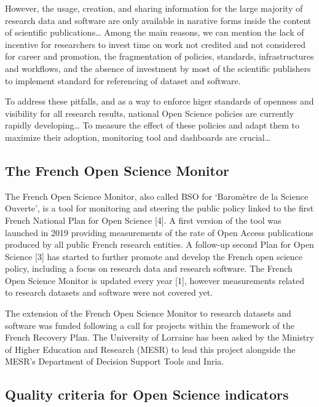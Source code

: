 \documentclass[
]{article}
\begin{document}
However, the usage, creation, and sharing information for the large
majority of research data and software are only available in narative
forms inside the content of scientific publications\ldots{} Among the
main reasons, we can mention the lack of incentive for researchers to
invest time on work not credited and not considered for career and
promotion, the fragmentation of policies, standards, infrastructures and
workflows, and the absence of investment by most of the scientific
publishers to implement standard for referencing of dataset and
software.

To address these pitfalls, and as a way to enforce higer standards of
openness and visibility for all research results, national Open Science
policies are currently rapidly developing\ldots{} To measure the effect
of these policies and adapt them to maximize their adoption, monitoring
tool and dashboards are crucial\ldots{}

\hypertarget{the-french-open-science-monitor}{%
\subsection{The French Open Science
Monitor}\label{the-french-open-science-monitor}}

The French Open Science Monitor, also called BSO for `Baromètre de la
Science Ouverte', is a tool for monitoring and steering the public
policy linked to the first French National Plan for Open Science
{[}4{]}. A first version of the tool was launched in 2019 providing
measurements of the rate of Open Access publications produced by all
public French research entities. A follow-up second Plan for Open
Science {[}3{]} has started to further promote and develop the French
open science policy, including a focus on research data and research
software. The French Open Science Monitor is updated every year {[}1{]},
however measurements related to research datasets and software were not
covered yet.

The extension of the French Open Science Monitor to research datasets
and software was funded following a call for projects within the
framework of the French Recovery Plan. The University of Lorraine has
been asked by the Ministry of Higher Education and Research (MESR) to
lead this project alongside the MESR's Department of Decision Support
Tools and Inria.

\hypertarget{quality-criteria-for-open-science-indicators}{%
\subsection{Quality criteria for Open Science
indicators}\label{quality-criteria-for-open-science-indicators}}
\end{document}
